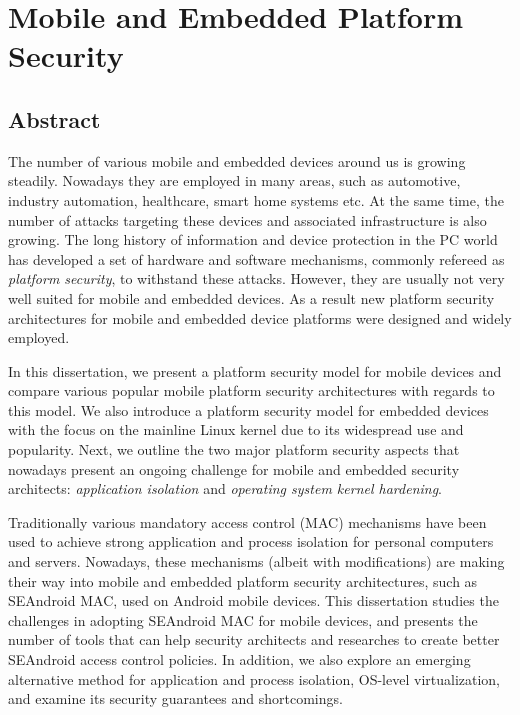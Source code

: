 \chapter*{Mobile and Embedded Platform Security}


\section*{Abstract}

The number of various mobile and embedded devices around us is growing steadily. Nowadays they are employed in many areas, such as automotive, industry automation, healthcare, smart home systems etc. At the same time, the number of attacks targeting these devices and associated infrastructure is also growing. The long history of information and device protection in the PC world has developed a set of hardware and software mechanisms, commonly refereed as \textit{platform security}, to withstand these attacks. However, they are usually not very well suited for mobile and embedded devices. As a result new platform security architectures for mobile and embedded device platforms were designed and widely employed. 

In this dissertation, we present a platform security model for mobile devices and compare various popular mobile platform security architectures with regards to this model. We also introduce a platform security model for embedded devices with the focus on the mainline Linux kernel due to its widespread use and popularity. Next, we outline the two major platform security aspects that nowadays present an ongoing challenge for mobile and embedded security architects: \textit{application isolation} and \textit{operating system kernel hardening}.   

Traditionally various mandatory access control (MAC) mechanisms have been used to achieve strong application and process isolation for personal computers and servers. Nowadays, these mechanisms (albeit with modifications) are making their way into mobile and embedded platform security architectures, such as SEAndroid MAC, used on Android mobile devices. This dissertation studies the challenges in adopting SEAndroid MAC for mobile devices, and presents the number of tools that can help security architects and researches to create better SEAndroid access control policies. In addition, we also explore an emerging alternative method for application and process isolation, OS-level virtualization, and examine its security guarantees and shortcomings. 

